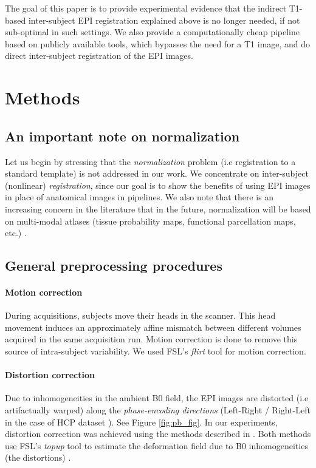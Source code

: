 The goal of this paper is to provide experimental evidence that the
indirect T1-based inter-subject EPI registration explained above is no
longer needed, if not sub-optimal in such settings. We also provide a
computationally cheap pipeline based on publicly available tools,
which bypasses the need for a T1 image, and do direct inter-subject
registration of the EPI images.

\section{Methods}
\subsection{An important note on normalization}
Let us begin by stressing that the \textit{normalization} problem (i.e
registration to a standard template) is not addressed in our work. We
concentrate on inter-subject (nonlinear) \textit{registration}, since
our goal is to show the benefits of using EPI images in place of
anatomical images in pipelines. 
%
We also note that there is an increasing concern in the literature
that in the future, normalization will be based on multi-modal atlases
(tissue probability maps, functional parcellation maps, etc.)
\citep{pmid24936682}.
\subsection{General preprocessing procedures}
\label{sec:gen_proc}
\paragraph{Motion correction}
During acquisitions, subjects move their heads in the
scanner. This head movement induces an approximately affine mismatch
between different volumes acquired in the same acquisition
run. Motion correction is done to remove this source of intra-subject
variability.
We used FSL's \textit{flirt} tool \citep{smith2004} for motion correction.

\paragraph{Distortion correction}
\label{sec:dc}
Due to inhomogeneities in the ambient B0 field,
the EPI images are distorted (i.e artifactually warped) along the \textit{phase-encoding
  directions} (Left-Right / Right-Left in the case of HCP dataset
\citep{VanEssen20122222}). See Figure \ref{fig:pb_fig}. In our
experiments, distortion correction \citep{pmid9178246,pmid12270226,zeng2002,anderson2003,jezzard1995correction,wan1997reduction} was
achieved using %
the methods described in \citep{VanEssen20122222}. %
Both methods use  FSL's \textit{topup} tool \citep{smith2004} to
estimate the deformation field due to B0 inhomogeneities (the
distortions) \citep{glasser2013}.

